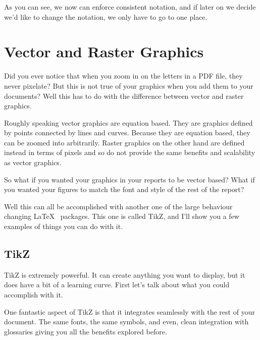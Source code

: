 \documentclass[hidelinks, float=false, crop=false]{article}
\begin{document}
        As you can see, we now can enforce consistent notation, and if later on we decide we'd like
        to change the notation, we only have to go to one place.
        

    \section{Vector and Raster Graphics}
        Did you ever notice that when you zoom in on the letters in a PDF file, they never pixelate?
        But this is not true of your graphics when you add them to your documents? Well this has
        to do with the difference between vector and raster graphics. 

        Roughly speaking vector graphics are equation based. They are graphics defined by points 
        connected by lines and curves. Because they are equation based, they can be zoomed into
        arbitrarily. Raster graphics on the other hand are defined instead in terms of pixels and 
        so do not provide the same benefits and scalability as vector graphics.

        So what if you wanted your graphics in your reports to be vector based? What if you wanted
        your figures to match the font and style of the rest of the report? 

        Well this can all be accomplished with another one of the large behaviour changing \LaTeX~
        packages. This one is called TikZ, and I'll show you a few examples of things you can do
        with it.

        \subsection{TikZ}
            TikZ is extremely powerful. It can create anything you want to display, but it does have
            a bit of a learning curve. First let's talk about what you could accomplish with it.

            One fantastic aspect of TikZ is that it integrates seamlessly with the rest of your
            document. The same fonts, the same symbols, and even, clean integration with glossaries
            giving you all the benefits explored before. 
\end{document}
